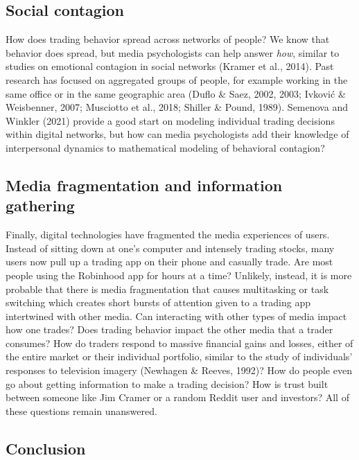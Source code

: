 \documentclass[12pt,]{article}
\begin{document}
\hypertarget{social-contagion}{%
\subsection{Social contagion}\label{social-contagion}}

How does trading behavior spread across networks of people? We know that
behavior does spread, but media psychologists can help answer
\emph{how}, similar to studies on emotional contagion in social networks
(Kramer et al., 2014). Past research has focused on aggregated groups of
people, for example working in the same office or in the same geographic
area (Duflo \& Saez, 2002, 2003; Ivković \& Weisbenner, 2007; Musciotto
et al., 2018; Shiller \& Pound, 1989). Semenova and Winkler (2021)
provide a good start on modeling individual trading decisions within
digital networks, but how can media psychologists add their knowledge of
interpersonal dynamics to mathematical modeling of behavioral contagion?

\hypertarget{media-fragmentation-and-information-gathering}{%
\subsection{Media fragmentation and information
gathering}\label{media-fragmentation-and-information-gathering}}

Finally, digital technologies have fragmented the media experiences of
users. Instead of sitting down at one's computer and intensely trading
stocks, many users now pull up a trading app on their phone and casually
trade. Are most people using the Robinhood app for hours at a time?
Unlikely, instead, it is more probable that there is media fragmentation
that causes multitasking or task switching which creates short bursts of
attention given to a trading app intertwined with other media. Can
interacting with other types of media impact how one trades? Does
trading behavior impact the other media that a trader consumes? How do
traders respond to massive financial gains and losses, either of the
entire market or their individual portfolio, similar to the study of
individuals' responses to television imagery (Newhagen \& Reeves, 1992)?
How do people even go about getting information to make a trading
decision? How is trust built between someone like Jim Cramer or a random
Reddit user and investors? All of these questions remain unanswered.

\hypertarget{conclusion}{%
\subsection{Conclusion}\label{conclusion}}
\end{document}
